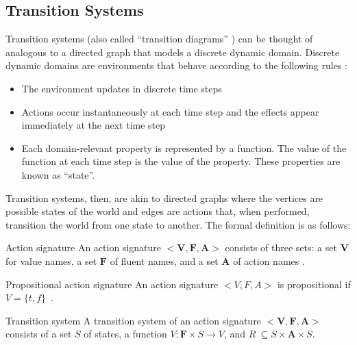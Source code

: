 \subsection{Transition Systems}
\label{subsec:transition_systems}

Transition systems (also called ``transition diagrams'' \cite{blount_architecture_2013}) can be thought of analogous to a directed graph that models a discrete dynamic domain.
Discrete dynamic domains are environments that behave according to the following rules \cite{blount_architecture_2013}:

\begin{itemize}
    \item The environment updates in discrete time steps
    \item Actions occur instantaneously at each time step and the effects appear immediately at the next time step
    \item Each domain-relevant property is represented by a function.
        The value of the function at each time step is the value of the property.
        These properties are known as ``state''.
\end{itemize}

Transition systems, then, are akin to directed graphs where the vertices are possible states of the world and edges are actions that, when performed, transition the world from one state to another.
The formal definition is as follows:

\begin{definition}{Action signature}
    An action signature $ < \boldsymbol{V}, \boldsymbol{F}, \boldsymbol{A}> $ consists of three sets: a set $ \boldsymbol{V} $ for value names, a set $ \boldsymbol{F} $ of fluent names, and a set $ \boldsymbol{A} $ of action names \cite{gelfond_action_1998}.
\end{definition}

\begin{definition}{Propositional action signature}
    An action signature $< V,F,A >$ is propositional if $V=\{t,f\}$~\cite{gelfond_action_1998}.
\end{definition}

\begin{definition}{Transition system}
    A transition system of an action signature $ < \boldsymbol{V}, \boldsymbol{F}, \boldsymbol{A}> $ consists of a set $ S $ of states, a function $ V : \boldsymbol{F} \times S\rightarrow V $, and $ R\ \subseteq S \times \boldsymbol{A} \times S $.
\end{definition}

